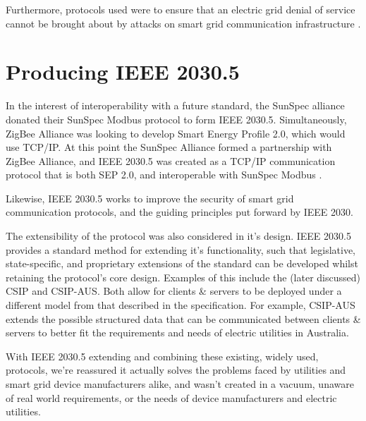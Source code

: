 Furthermore, protocols used were to ensure that an electric grid denial of service cannot be brought about by attacks on smart grid communication infrastructure \cite{2030Security} \cite[]{2030}. 


\section{Producing IEEE 2030.5}

In the interest of interoperability with a future standard, the SunSpec alliance donated their SunSpec Modbus protocol to form IEEE 2030.5. Simultaneously, ZigBee Alliance was looking to develop Smart Energy Profile 2.0, which would use TCP/IP.
At this point the SunSpec Alliance formed a partnership with ZigBee Alliance, and IEEE 2030.5 was created as a TCP/IP communication protocol that is both SEP 2.0, and interoperable with SunSpec Modbus \cite[]{SunspecModbusArticle}. 

Likewise, IEEE 2030.5 works to improve the security of smart grid communication protocols, and the guiding principles put forward by IEEE 2030. 

The extensibility of the protocol was also considered in it's design. IEEE 2030.5 provides a standard method for extending it's functionality, such that legislative, state-specific, and proprietary extensions of the standard can be developed whilst retaining the protocol's core design. Examples of this include the (later discussed) CSIP and CSIP-AUS. Both allow for clients \& servers to be deployed under a different model from that described in the specification. For example, CSIP-AUS extends the possible structured data that can be communicated between clients \& servers to better fit the requirements and needs of electric utilities in Australia.

With IEEE 2030.5 extending and combining these existing, widely used, protocols, we're reassured it actually solves the problems faced by utilities and smart grid device manufacturers alike, and wasn't created in a vacuum, unaware of real world requirements, or the needs of device manufacturers and electric utilities.


